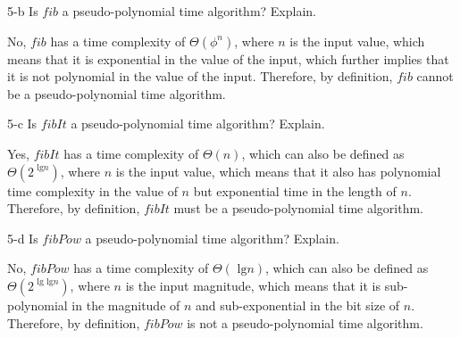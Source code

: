\documentclass[11pt]{article}
\newcommand{\tlg}{\text{ lg}}
\begin{document}
\begin{prob}{5-b}
Is $fib$ a pseudo-polynomial time algorithm? Explain.
\end{prob}
\begin{sol}

No, $fib$ has a time complexity of $\Theta(\phi^{n})$, where $n$ is the input value, which means that it is exponential in the value of the input, which further implies that it is not polynomial in the value of the input. Therefore, by definition, $fib$ cannot be a pseudo-polynomial time algorithm.
\end{sol}

\begin{prob}{5-c}
Is $fibIt$ a pseudo-polynomial time algorithm? Explain.
\end{prob}
\begin{sol}

Yes, $fibIt$ has a time complexity of $\Theta(n)$, which can also be defined as $\Theta(2^{\tlg n})$, where $n$ is the input value, which means that it also has polynomial time complexity in the value of $n$ but exponential time in the length of $n$. Therefore, by definition, $fibIt$ must be a pseudo-polynomial time algorithm.
\end{sol}

\begin{prob}{5-d}
Is $fibPow$ a pseudo-polynomial time algorithm? Explain.
\end{prob}
\begin{sol}

No, $fibPow$ has a time complexity of $\Theta(\tlg n)$, which can also be defined as $\Theta(2^{\tlg \tlg n})$, where $n$ is the input magnitude, which means that it is sub-polynomial in the magnitude of $n$ and sub-exponential in the bit size of $n$. Therefore, by definition, $fibPow$ is not a pseudo-polynomial time algorithm.

\end{sol}
\end{document}
